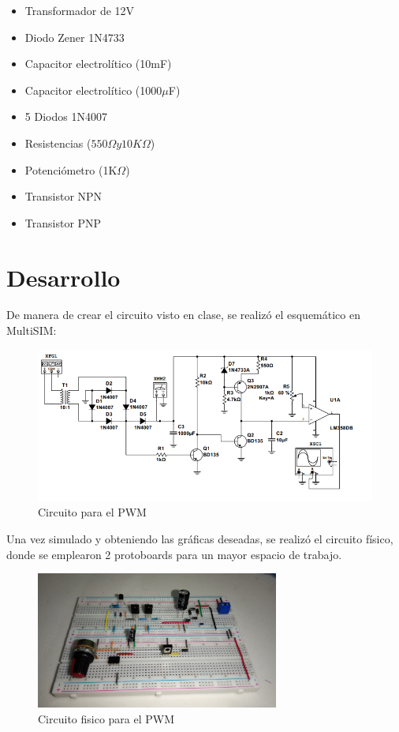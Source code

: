 \documentclass[]{article}
\begin{document}
\begin{itemize}
    \item Transformador de 12V
    \item Diodo Zener 1N4733
    \item Capacitor electrolítico (10mF)
    \item Capacitor electrolítico (1000$\mu$F)
    \item 5 Diodos 1N4007
    \item Resistencias ($550\Omega y 10K\Omega$)
    \item Potenciómetro (1K$\Omega$)
    \item Transistor NPN
    \item Transistor PNP 
\end{itemize}

\section{Desarrollo}

De manera de crear el circuito visto en clase, se realizó el esquemático en MultiSIM:

\begin{figure}
    \centering
    \includegraphics[width=12cm]{build/Imagenes/Circuito.png}
    \caption{Circuito para el PWM}
\end{figure}

Una vez simulado y obteniendo las gráficas deseadas, se realizó el circuito físico, donde se emplearon 2 protoboards para un mayor espacio de trabajo.

\begin{figure}
    \centering
    \includegraphics[width=8cm]{build/Imagenes/Circuito3.jpg}
    \caption{Circuito fisico para el PWM}
\end{figure}
\end{document}
